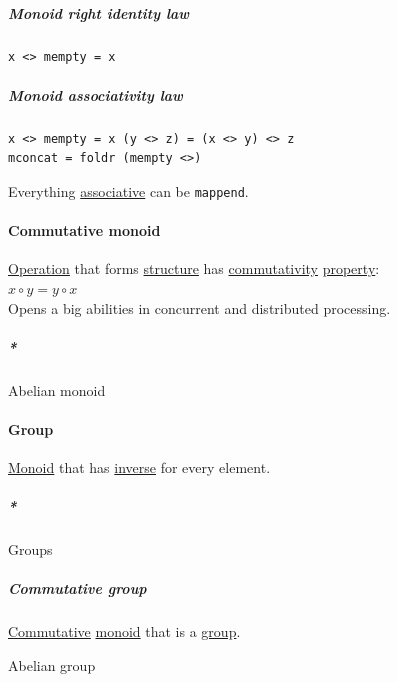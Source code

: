 \documentclass[a4paper,14pt,oneside]{book}
\begin{document}
\subparagraph{\label{orge895154}Monoid right identity law}
\label{sec:org6791d66}
\begin{verbatim}
x <> mempty = x
\end{verbatim}

\subparagraph{\label{org5287a5a}Monoid associativity law}
\label{sec:org7f1cd98}
\begin{verbatim}
x <> mempty = x (y <> z) = (x <> y) <> z
mconcat = foldr (mempty <>)
\end{verbatim}

Everything \hyperref[orgb696e0e]{associative} can be \texttt{mappend}.\\

\paragraph{\label{org63e19e1}Commutative monoid}
\label{sec:orgd88f430}
\hyperref[org1e066f3]{Operation} that forms \hyperref[org2f999c6]{structure} has \hyperref[orgfd6fd64]{commutativity} \hyperref[orga548a30]{property}:\\
\(x \circ y = y \circ x\)\\

Opens a big abilities in concurrent and distributed processing.\\

\subparagraph{\emph{*}}
\label{sec:org544603b}

\label{org82557e8}Abelian monoid\\

\paragraph{\label{orgff36d0c}Group}
\label{sec:orge9237b2}
\hyperref[orgb6f1b3a]{Monoid} that has \hyperref[orgfe8ab3c]{inverse} for every element.\\

\subparagraph{\emph{*}}
\label{sec:org78736c9}

\label{org73a2ffe}Groups\\

\subparagraph{\label{org52df6ee}Commutative group}
\label{sec:org648790d}
\hyperref[orga8d85e9]{Commutative} \hyperref[orgb6f1b3a]{monoid} that is a \hyperref[orgff36d0c]{group}.\\

\subsubparagraph{\emph{*}}
\label{sec:orgd7b5e2a}

\label{org224edb7}Abelian group\\
\end{document}
